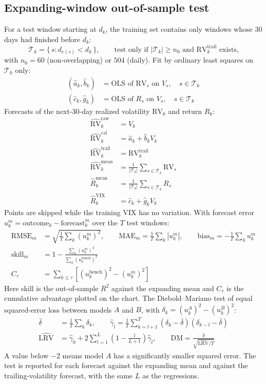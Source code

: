 \documentclass[11pt]{article}
\begin{document}
\subsection*{Expanding-window out-of-sample test}
For a test window starting at $d_k$, the training set contains only windows whose 30 days had finished before $d_k$:
\[
\mathcal{T}_k = \{\, s : d_{e(s)} < d_k \,\}, \qquad \text{test only if } |\mathcal{T}_k| \ge n_0 \text{ and } \mathrm{RV}^{\mathrm{trail}}_k \text{ exists,}
\]
with $n_0 = 60$ (non-overlapping) or $504$ (daily). Fit by ordinary least squares on $\mathcal{T}_k$ only:
\begin{align*}
(\hat a_k, \hat b_k) &= \text{OLS of } \mathrm{RV}_s \text{ on } V_s, \quad s \in \mathcal{T}_k\\
(\hat c_k, \hat g_k) &= \text{OLS of } R_s \text{ on } V_s, \quad s \in \mathcal{T}_k
\end{align*}
Forecasts of the next-30-day realized volatility $\mathrm{RV}_k$ and return $R_k$:
\begin{align*}
\widehat{\mathrm{RV}}^{\text{raw}}_k &= V_k\\
\widehat{\mathrm{RV}}^{\text{cal}}_k &= \hat a_k + \hat b_k V_k\\
\widehat{\mathrm{RV}}^{\text{trail}}_k &= \mathrm{RV}^{\mathrm{trail}}_k\\
\widehat{\mathrm{RV}}^{\text{mean}}_k &= \frac{1}{|\mathcal{T}_k|}\sum_{s \in \mathcal{T}_k} \mathrm{RV}_s\\
\widehat{R}^{\text{mean}}_k &= \frac{1}{|\mathcal{T}_k|}\sum_{s \in \mathcal{T}_k} R_s\\
\widehat{R}^{\text{VIX}}_k &= \hat c_k + \hat g_k V_k
\end{align*}
Points are skipped while the training VIX has no variation. With forecast error $u^{m}_k = \text{outcome}_k - \text{forecast}^{m}_k$ over the $T$ test windows:
\begin{align*}
\mathrm{RMSE}_m &= \sqrt{\tfrac1T \sum_k (u^m_k)^2}, \qquad \mathrm{MAE}_m = \tfrac1T\sum_k |u^m_k|, \qquad \mathrm{bias}_m = -\tfrac1T\sum_k u^m_k\\
\text{skill}_m &= 1 - \frac{\sum_k (u^m_k)^2}{\sum_k (u^{\text{bench}}_k)^2}\\
C_\tau &= \sum_{k \le \tau}\left[(u^{\text{bench}}_k)^2 - (u^m_k)^2\right]
\end{align*}
Here skill is the out-of-sample $R^2$ against the expanding mean and $C_\tau$ is the cumulative advantage plotted on the chart. The Diebold--Mariano test of equal squared-error loss between models $A$ and $B$, with $\delta_k = (u^A_k)^2 - (u^B_k)^2$:
\begin{align*}
\bar\delta &= \frac1T\sum_k \delta_k, \qquad \hat\gamma_l = \frac1T\sum_{k=l+1}^{T}(\delta_k - \bar\delta)(\delta_{k-l} - \bar\delta)\\
\widehat{\mathrm{LRV}} &= \hat\gamma_0 + 2\sum_{l=1}^{L}\left(1 - \frac{l}{L+1}\right)\hat\gamma_l, \qquad
\mathrm{DM} = \frac{\bar\delta}{\sqrt{\widehat{\mathrm{LRV}}/T}}
\end{align*}
A value below $-2$ means model $A$ has a significantly smaller squared error. The test is reported for each forecast against the expanding mean and against the trailing-volatility forecast, with the same $L$ as the regressions.
\end{document}
